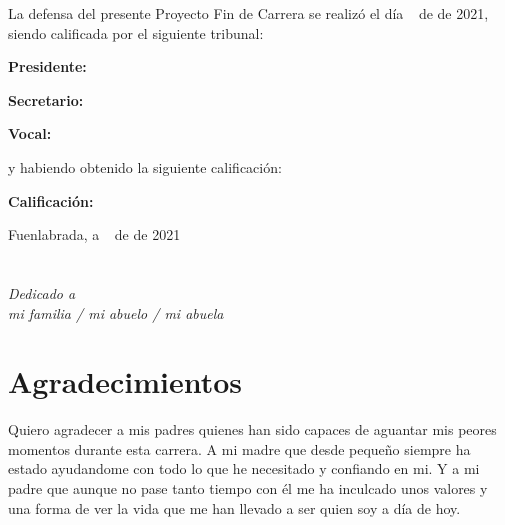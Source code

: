 \documentclass[a4paper, 12pt]{book}
\begin{document}
\vspace{1cm}
La defensa del presente Proyecto Fin de Carrera se realizó el día \qquad$\;\,$ de \qquad\qquad\qquad\qquad \newline de 2021, siendo calificada por el siguiente tribunal:


\vspace{0.5cm}
\textbf{Presidente:}

\vspace{1.2cm}
\textbf{Secretario:}

\vspace{1.2cm}
\textbf{Vocal:}


\vspace{1.2cm}
y habiendo obtenido la siguiente calificación:

\vspace{1cm}
\textbf{Calificación:}


\vspace{1cm}
\begin{flushright}
Fuenlabrada, a \qquad$\;\,$ de \qquad\qquad\qquad\qquad de 2021
\end{flushright}


\chapter*{}
\begin{flushright}
\textit{Dedicado a \\
mi familia / mi abuelo / mi abuela}
\end{flushright}


\chapter*{Agradecimientos}

Quiero agradecer a mis padres quienes han sido capaces de aguantar mis peores momentos durante esta carrera. A mi madre que desde pequeño siempre ha estado ayudandome con todo lo que he necesitado y confiando en mi. Y a mi padre que aunque no pase tanto tiempo con él me ha inculcado unos valores y una forma de ver la vida que me han llevado a ser quien soy a día de hoy.
\end{document}
